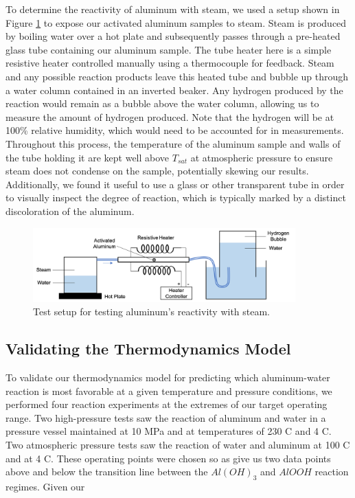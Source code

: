 \documentclass[preprint,12pt,3p]{elsarticle}
\begin{document}
To determine the reactivity of aluminum with steam, we used a setup shown in
Figure \ref{fig:steam_test_setup} to expose our activated aluminum samples to
steam. Steam is produced by boiling water over a hot plate and subsequently
passes through a pre-heated glass tube containing our aluminum sample. The tube
heater here is a simple resistive heater controlled manually using a
thermocouple for feedback. Steam and any possible reaction products leave this
heated tube and bubble up through a water column contained in an inverted
beaker. Any hydrogen produced by the reaction would remain as a bubble above the
water column, allowing us to measure the amount of hydrogen produced. Note that
the hydrogen will be at 100\% relative humidity, which would need to be
accounted for in measurements.  Throughout this process, the temperature of the
aluminum sample and walls of the tube holding it are kept well above $T_{sat}$
at atmospheric pressure to ensure steam does not condense on the sample,
potentially skewing our results.  Additionally, we found it useful to use a
glass or other transparent tube in order to visually inspect the degree of
reaction, which is typically marked by a distinct discoloration of the aluminum.

\begin{figure}
  \centering
  \includegraphics[width=0.9\textwidth]{fig/steam_test_setup}
  \caption{Test setup for testing aluminum's reactivity with steam.}
  \label{fig:steam_test_setup}
\end{figure}

\subsection{Validating the Thermodynamics Model}

To validate our thermodynamics model for predicting which aluminum-water
reaction is most favorable at a given temperature and pressure conditions, we
performed four reaction experiments at the extremes of our target operating
range. Two high-pressure tests saw the reaction of aluminum and water in a
pressure vessel maintained at 10 MPa and at temperatures of 230 \textdegree C
and 4 \textdegree C. Two atmospheric pressure tests saw the reaction of water
and aluminum at 100 \textdegree C and at 4 \textdegree C. These operating points
were chosen so as give us two data points above and below the transition line
between the $Al(OH)_3$ and $AlOOH$ reaction regimes. Given our 
\end{document}

